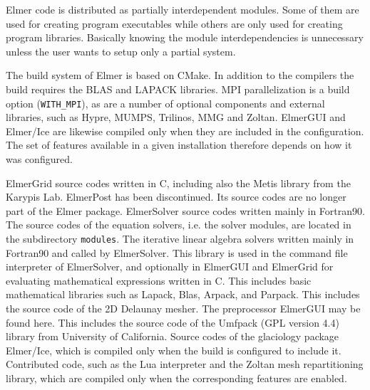 
Elmer code is distributed as partially interdependent modules. Some of them are used for creating
program executables while others are only used for creating program libraries. 
Basically knowing the module interdependencies is unnecessary unless the user wants to 
setup only a partial system.

The build system of Elmer is based on CMake. In addition to the compilers the build requires
the BLAS and LAPACK libraries. MPI parallelization is a build option (\texttt{WITH\_MPI}),
as are a number of optional components and external libraries, such as Hypre, MUMPS,
Trilinos, MMG and Zoltan. ElmerGUI and Elmer/Ice are likewise compiled only when
they are included in the configuration. The set of features available in a given
installation therefore depends on how it was configured.

\sifbegin
{}	
ElmerGrid source codes written in C, including also the Metis library from the Karypis Lab. 
ElmerPost has been discontinued. Its source codes are no longer part of the Elmer package.
ElmerSolver source codes written mainly in Fortran90. The source codes of the equation
solvers, i.e. the solver modules, are located in the subdirectory \texttt{modules}.
The iterative linear algebra solvers written mainly in Fortran90 and called by ElmerSolver.
This library is used in the command file interpreter of ElmerSolver, and optionally in ElmerGUI and
ElmerGrid for evaluating mathematical expressions written in C.  
This includes basic mathematical libraries such as Lapack, Blas, Arpack, and Parpack.
This includes the source code of the 2D Delaunay mesher. 
The preprocessor ElmerGUI may be found here.
This includes the source code of the Umfpack (GPL version 4.4) library from University of California.
Source codes of the glaciology package Elmer/Ice, which is compiled only when the build
is configured to include it.
Contributed code, such as the Lua interpreter and the Zoltan mesh repartitioning library,
which are compiled only when the corresponding features are enabled.
\sifend


